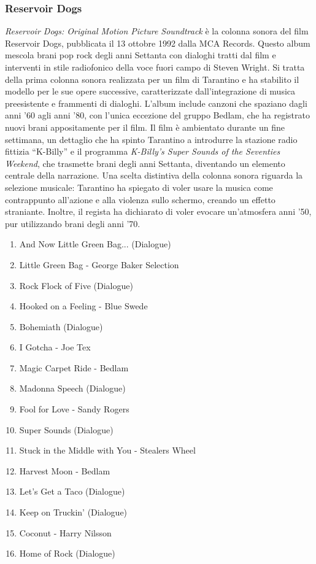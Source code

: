 \documentclass[12pt]{article} %
\begin{document}
\subsubsection*{Reservoir Dogs}
\begin{flushleft}
    \textit{Reservoir Dogs: Original Motion Picture Soundtrack} è la colonna sonora del film Reservoir Dogs, pubblicata il 13 ottobre 1992 dalla MCA Records. Questo album mescola brani pop rock degli anni Settanta con dialoghi tratti dal film e interventi in stile radiofonico della voce fuori campo di Steven Wright.  
    Si tratta della prima colonna sonora realizzata per un film di Tarantino e ha stabilito il modello per le sue opere successive, caratterizzate dall’integrazione di musica preesistente e frammenti di dialoghi. L’album include canzoni che spaziano dagli anni ’60 agli anni ’80, con l’unica eccezione del gruppo Bedlam, che ha registrato nuovi brani appositamente per il film.  
    Il film è ambientato durante un fine settimana, un dettaglio che ha spinto Tarantino a introdurre la stazione radio fittizia ``K-Billy” e il programma \textit{K-Billy's Super Sounds of the Seventies Weekend}, che trasmette brani degli anni Settanta, diventando un elemento centrale della narrazione.   
    Una scelta distintiva della colonna sonora riguarda la selezione musicale: Tarantino ha spiegato di voler usare la musica come contrappunto all'azione e alla violenza sullo schermo, creando un effetto straniante. Inoltre, il regista ha dichiarato di voler evocare un’atmosfera anni ’50, pur utilizzando brani degli anni ’70.
\end{flushleft}
    \break
    \small
    \begin{enumerate}
        \item And Now Little Green Bag... (Dialogue)
        \item Little Green Bag - George Baker Selection
        \item Rock Flock of Five (Dialogue)
        \item Hooked on a Feeling - Blue Swede
        \item Bohemiath (Dialogue)
        \item I Gotcha - Joe Tex
        \item Magic Carpet Ride - Bedlam
        \item Madonna Speech (Dialogue)
        \item Fool for Love - Sandy Rogers
        \item Super Sounds (Dialogue)
        \item Stuck in the Middle with You - Stealers Wheel
        \item Harvest Moon - Bedlam
        \item Let's Get a Taco (Dialogue)
        \item Keep on Truckin' (Dialogue)
        \item Coconut - Harry Nilsson
        \item Home of Rock (Dialogue)
    \end{enumerate}
    \break
\end{document}
